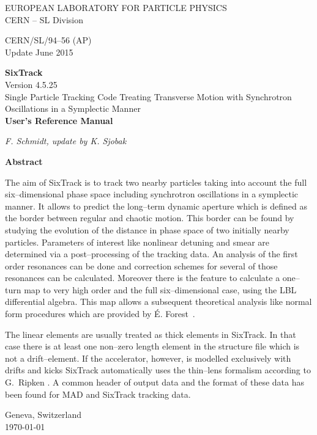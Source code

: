 \documentclass[a4paper,11pt]{report}
\begin{document}

\begin{titlepage}
\begin{center}\normalsize
  EUROPEAN LABORATORY FOR PARTICLE PHYSICS \\
  CERN -- SL Division
\end{center}
\vspace*{2mm}
\begin{flushright}
  CERN/SL/94--56  (AP) \\
  Update June 2015
\end{flushright}
\begin{center}\LARGE
  {\bf SixTrack} \\
  Version 4.5.25 \\
  {Single Particle Tracking Code Treating Transverse Motion with Synchrotron Oscillations in a Symplectic Manner} \\
  \vspace*{2mm} {\bf User's Reference Manual}
\end{center}
\begin{center}\em
  F. Schmidt, update by K. Sjobak
\end{center}
\begin{center}\large
  {\bf Abstract} \\
\end{center}
The aim of SixTrack is to track two nearby particles taking into
account the full six--dimensional phase space including synchrotron
oscillations in a symplectic manner. It allows to predict the
long--term dynamic aperture which is defined as the border between
regular and chaotic motion. This border can be found by studying the
evolution of the distance in phase space of two initially nearby
particles.  Parameters of interest like nonlinear detuning and smear
are determined via a post--processing of the tracking data.  An
analysis of the first order resonances can be done and correction
schemes for several of those resonances can be calculated.  Moreover
there is the feature to calculate a one--turn map to very high order
and the full six--dimensional case, using the LBL differential
algebra. This map allows a subsequent theoretical 
analysis like normal form procedures which are provided by \'{E}.
Forest~\cite{DALIE}.

The linear elements are usually treated as thick elements in
SixTrack\@.  In that case there is at least one non--zero length
element in the structure file which is not a drift--element.  If the
accelerator, however, is modelled exclusively with drifts and kicks
SixTrack automatically uses the thin--lens formalism according to
G.~Ripken \cite{Ripken95}. A common header of output
data and the format of these data has been found for MAD and SixTrack
tracking data.

\vfill
\begin{center}
  Geneva, Switzerland \\
  \today
\end{center}


\end{titlepage}
\end{document}
